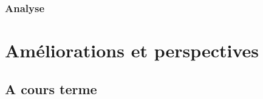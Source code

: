 \documentclass[10pt]{report}
\begin{document}
%		


	\subsection{Analyse}
	
\chapter{Améliorations et perspectives}
	\section{A cours terme}
		
\end{document}
